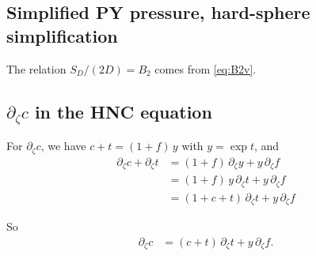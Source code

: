 \documentclass[preprint]{revtex4-1}
\numberwithin{equation}{subsection}
\numberwithin{table}{section}
\begin{document}
\subsection{Simplified PY pressure, hard-sphere simplification}

The relation $S_D/(2D) = B_2$ comes from \eqref{eq:B2v}.


\subsection{$\partial_\zeta c$ in the HNC equation}

For $\partial_\zeta c$, we have
$c + t = (1 + f) \, y$
with
$y = \exp t$,
and
\begin{align*}
  \partial_\zeta c + \partial_\zeta t
&= (1 + f) \, \partial_\zeta y
+ y \, \partial_\zeta f
\\
&= (1 + f) \, y \, \partial_\zeta t
+ y \, \partial_\zeta f
\\
&= (1 + c + t) \, \partial_\zeta t
+ y \, \partial_\zeta f
\end{align*}

So
\begin{align*}
  \partial_\zeta c
&= (c + t) \, \partial_\zeta t
+ y \, \partial_\zeta f.
\end{align*}


%
\end{document}
